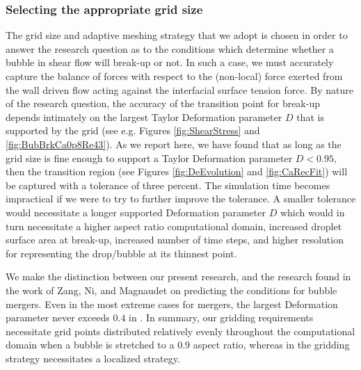 \documentclass[%
 reprint,
 showkeys,
 amsmath,amssymb,
 aps,
 prfluids,
 onecolumn
]{revtex4-2}
\begin{document}
\subsubsection{Selecting the appropriate grid size}

{ \color{red}
The grid size and adaptive meshing strategy that we adopt is chosen
in order to answer the research question as to the conditions which determine
whether a bubble in shear flow
will break-up or not.  In such a case, we must accurately capture the 
balance of forces with respect to the (non-local) force exerted from the 
wall driven 
flow acting against the interfacial
surface tension force.  By nature of the research question, 
the accuracy of the transition
point for break-up depends intimately on the 
largest Taylor Deformation parameter $D$
that is supported by the grid (see e.g. Figures \ref{fig:ShearStress} and
\ref{fig:BubBrkCa0p8Re43}).  
As we report here, we have found that as
long as the grid size is fine enough to support a Taylor Deformation parameter
$D<0.95$, then the transition region 
(see Figures \ref{fig:DeEvolution} and \ref{fig:CaRecFit}) will be captured
with a tolerance of three percent.  The simulation time becomes impractical
if we were to try to further improve the tolerance.  A smaller tolerance
would necessitate a longer supported Deformation
parameter $D$ which would in turn necessitate a higher aspect ratio
computational domain, increased droplet surface area at break-up,
increased number of time steps, and higher resolution for representing the
drop/bubble at its thinnest point.

We make the distinction between our present research, and the research found
in the work of Zang, Ni, 
and Magnaudet\cite{zhang2021three,zhang2022three} on predicting the
conditions for bubble mergers.  Even in the most extreme cases for
mergers, the largest Deformation parameter never exceeds
$0.4$ in \cite{zhang2021three}.  In summary, our gridding requirements 
necessitate grid points distributed relatively evenly throughout the 
computational domain when a bubble is stretched to a $0.9$ aspect ratio,
whereas in \cite{zhang2021three} the gridding strategy necessitates 
a localized strategy.

}
\end{document}
